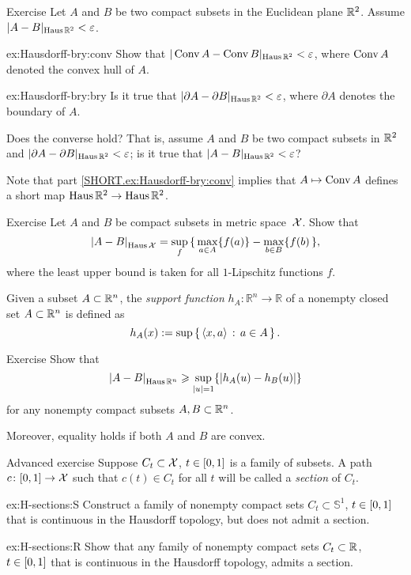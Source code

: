 \begin{thm}{Exercise}\label{ex:Hausdorff-bry}
Let $A$ and $B$ be two compact subsets in the Euclidean plane $\mathbb{R}^2$.
Assume $|A-B|_{\operatorname{\rm Haus}\nolimits\mathbb{R}^2}<\varepsilon$.

\begin{subthm}{ex:Hausdorff-bry:conv}
Show that $|\mathop{\rm Conv}\nolimits A-\mathop{\rm Conv}\nolimits B|_{\operatorname{\rm Haus}\nolimits\mathbb{R}^2}<\varepsilon$, where $\mathop{\rm Conv}\nolimits A$ denoted the convex hull of $A$.
\end{subthm}
\begin{subthm}{ex:Hausdorff-bry:bry}
Is it true that
$|\partial A-\partial B|_{\operatorname{\rm Haus}\nolimits\mathbb{R}^2}<\varepsilon$,
where $\partial A$ denotes the boundary of $A$.

Does the converse hold? That is, assume $A$ and $B$ be two compact subsets in $\mathbb{R}^2$
and $|\partial A-\partial B|_{\operatorname{\rm Haus}\nolimits\mathbb{R}^2}<\varepsilon$; 
is it true that $|A-B|_{\Haus\RR^2}\z<\eps$?
\end{subthm}

\end{thm}

Note that part \ref{SHORT.ex:Hausdorff-bry:conv} implies that $A\mapsto \mathop{\rm Conv}\nolimits A$ defines a short map $\operatorname{\rm Haus}\nolimits\mathbb{R}^2\to \operatorname{\rm Haus}\nolimits\mathbb{R}^2$. 

\begin{thm}{Exercise}\label{ex:Haus-func}
Let $A$ and $B$ be compact subsets in metric space~$\mathcal{X}$.
Show that 
\[\dist{A}{B}{\Haus\spc{X}}=\sup_f\, \{\,\max_{a\in A}\{f(a)\}-\max_{b\in B}\{f(b)\,\},\]
where the least upper bound is taken for all $1$-Lipschitz functions $f$.

\end{thm}

Given a subset $A\subset \mathbb{R}^n$,
the \emph{support function} $h_A\colon\mathbb{R}^n\to\mathbb{R}$ of a  nonempty closed set $A\subset \mathbb{R}^n$ is defined as 
\[h_A(x)
\mathrel{:=}
\sup\left\{\,{\langle x, a\rangle}\,:\,{a\in A}\,\right\}.\]

\begin{thm}{Exercise}\label{ex:Haus-support}
Show that 
\[\dist{A}{B}{\Haus\RR^n}\ge \sup_{|u|=1}\{|h_A(u)-h_B(u)|\}\]
for any nonempty compact subsets $A,B\subset \mathbb{R}^n$.

Moreover, equality holds if both $A$ and $B$ are convex.
\end{thm}


\begin{thm}{Advanced exercise}\label{ex:H-sections}
Suppose $C_t\subset \mathcal{X}$, $t\z\in [0,1]$ is a family of subsets.
A path $c\colon[0,1]\to \mathcal{X}$ such that $c(t)\in C_t$ for all $t$ will be called a {}\emph{section} of $C_t$.

\begin{subthm}{ex:H-sections:S}
Construct a family of nonempty compact sets $C_t\subset\mathbb{S}^1$, $t\z\in [0,1]$ that is continuous in the Hausdorff topology, 
but does not admit a section.
\end{subthm}

\begin{subthm}{ex:H-sections:R}
Show that any family of nonempty compact sets $C_t\subset\mathbb{R}$, $t\z\in [0,1]$ that is continuous in the Hausdorff topology, 
admits a section.
\end{subthm}

\end{thm}

